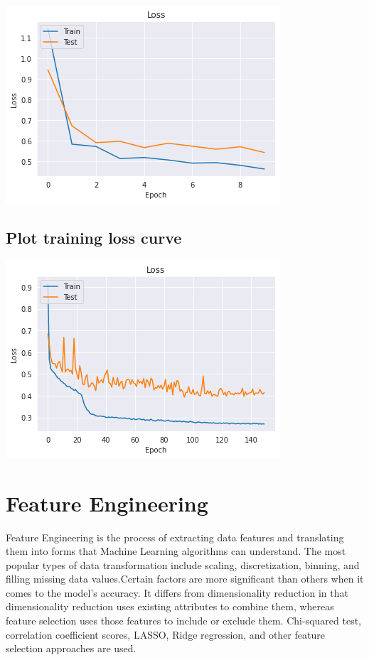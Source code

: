 \documentclass[journal,twoside,web]{ieeecolor}
\begin{document}
\includegraphics[scale=0.5]{train and test.png}
\subsection{Plot training loss curve}
\includegraphics[scale=0.5]{loss.png}

\section{Feature Engineering}
Feature Engineering is the process of extracting data features and translating them into forms that Machine Learning algorithms can understand. The most popular types of data transformation include scaling, discretization, binning, and filling missing data values.Certain factors are more significant than others when it comes to the model's accuracy. It differs from dimensionality reduction in that dimensionality reduction uses existing attributes to combine them, whereas feature selection uses those features to include or exclude them.
Chi-squared test, correlation coefficient scores, LASSO, Ridge regression, and other feature selection approaches are used.
\end{document}
